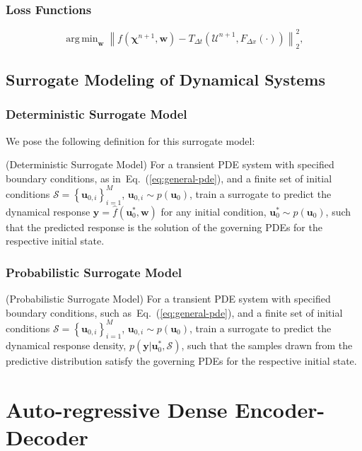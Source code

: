 \documentclass{beamer}
\theoremstyle{remark}
\newcommand{\norm}[1]{\left\lVert #1 \right\rVert}
\DeclareMathOperator*{\argmin}{arg\,min}
\def\Eqref#1{Eq.~(\ref{#1})}
\begin{document}
\begin{frame}
\frametitle{Loss Functions}
\begin{equation}
    \argmin_{\textbf{w}} \norm{f\left(\bm{\chi}^{n+1}, \textbf{w}\right) -  T_{\Delta t}\left(\bm{\mathcal{U}}^{n+1}, F_{\Delta x}(\cdot)\right)}^{2}_{2},
    \label{eq:general-loss}
\end{equation}
\end{frame}

\subsection{Surrogate Modeling of Dynamical Systems}

\begin{frame}
\frametitle{Deterministic Surrogate Model}

We pose the following definition for this surrogate model:
\theoremstyle{definition}
\begin{definition}{(Deterministic Surrogate Model)}
For a transient PDE system with specified boundary conditions, as in~\Eqref{eq:general-pde}, and a finite set of initial conditions $\mathcal{S}=\left\{\bm{u}_{0,i}\right\}_{i=1}^{M}$, $\bm{u}_{0,i} \sim p\left(\bm{u}_{0}\right)$, train a surrogate to predict the dynamical response $\bm{y}=\hat{f}\left(\bm{u}_{0}^{*}, \textbf{w}\right)$ for any initial condition, $\bm{u}_{0}^{*} \sim p\left(\bm{u}_{0}\right)$, such that the predicted response is the solution of the governing PDEs for the respective initial state.
\end{definition}

\end{frame}

\begin{frame}
\frametitle{Probabilistic Surrogate Model}
\theoremstyle{definition}
\begin{definition}{(Probabilistic Surrogate Model)}
    For a transient PDE system with specified boundary conditions, such as~\Eqref{eq:general-pde}, and a finite set of initial conditions $\mathcal{S}=\left\{\bm{u}_{0,i}\right\}_{i=1}^{M}$, $\bm{u}_{0,i} \sim p\left(\bm{u}_{0}\right)$, train a surrogate to predict the dynamical response density, $p\left(\bm{y}| \bm{u}_{0}^{*}, \mathcal{S}\right)$, such that the samples drawn from the predictive distribution satisfy the governing PDEs for the respective initial state.
\end{definition}
\end{frame}

\section{Auto-regressive Dense Encoder-Decoder}
\end{document}
